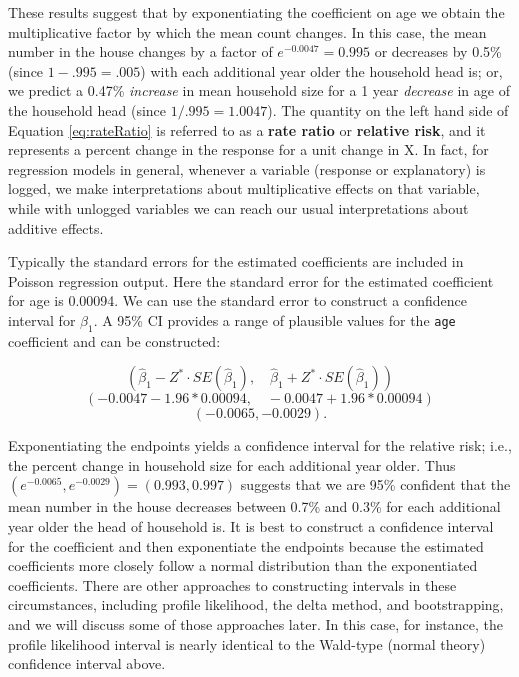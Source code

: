 \documentclass[
]{krantz}
\begin{document}
These results suggest that by exponentiating the coefficient on age we obtain the multiplicative factor by which the mean count changes. In this case, the mean number in the house changes by a factor of \(e^{-0.0047}=0.995\) or decreases by 0.5\% (since \(1-.995 = .005\)) with each additional year older the household head is; or, we predict a 0.47\% \emph{increase} in mean household size for a 1 year \emph{decrease} in age of the household head (since \(1/.995=1.0047\)). The quantity on the left hand side of Equation \eqref{eq:rateRatio} is referred to as a \textbf{rate ratio} or \textbf{relative risk},  and it represents a percent change in the response for a unit change in X. In fact, for regression models in general, whenever a variable (response or explanatory) is logged, we make interpretations about multiplicative effects on that variable, while with unlogged variables we can reach our usual interpretations about additive effects.

Typically the standard errors for the estimated coefficients are included in Poisson regression output. Here the standard error for the estimated coefficient for age is 0.00094. We can use the standard error to construct a confidence interval for \(\beta_1\). A 95\% CI provides a range of plausible values for the \texttt{age} coefficient and can be constructed:

\[(\hat\beta_1-Z^*\cdot SE(\hat\beta_1), \quad \hat\beta_1+Z^*\cdot SE(\hat\beta_1))\]
\[(-0.0047-1.96*0.00094, \quad -0.0047+1.96*0.00094)\]
\[ (-0.0065, -0.0029).
 \]

Exponentiating the endpoints yields a confidence interval for the relative risk; i.e., the percent change in household size for each additional year older. Thus \((e^{-0.0065},e^{-0.0029})=(0.993,0.997)\) suggests that we are 95\% confident that the mean number in the house decreases between 0.7\% and 0.3\% for each additional year older the head of household is. It is best to construct a confidence interval for the coefficient and then exponentiate the endpoints because the estimated coefficients more closely follow a normal distribution than the exponentiated coefficients. There are other approaches to constructing intervals in these circumstances, including profile likelihood, the delta method, and bootstrapping, and we will discuss some of those approaches later. In this case, for instance, the profile likelihood interval is nearly identical to the Wald-type (normal theory) confidence interval  above.
\end{document}
